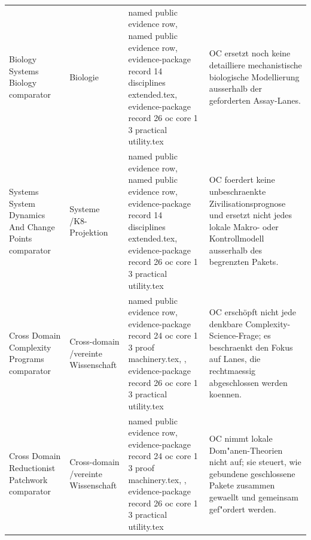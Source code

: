 \begin{longtable}{@{}L{0.20\textwidth}L{0.11\textwidth}L{0.33\textwidth}L{0.28\textwidth}@{}}
Biology Systems Biology comparator & Biologie & named public evidence row, named public evidence row, \allowbreak evidence-package record 14 disciplines extended.tex, \allowbreak evidence-package record 26 oc core 1 3 practical utility.tex & OC ersetzt noch keine detailliere mechanistische biologische Modellierung ausserhalb der geforderten Assay-Lanes. \\
Systems System Dynamics And Change Points comparator & Systeme /\allowbreak K8-Projektion & named public evidence row, named public evidence row, \allowbreak evidence-package record 14 disciplines extended.tex, \allowbreak evidence-package record 26 oc core 1 3 practical utility.tex & OC foerdert keine unbeschraenkte Zivilisationsprognose und ersetzt nicht jedes lokale Makro- oder Kontrollmodell ausserhalb des begrenzten Pakets. \\
Cross Domain Complexity Programs comparator & Cross-domain /\allowbreak vereinte Wissenschaft & named public evidence row, \allowbreak evidence-package record 24 oc core 1 3 proof machinery.tex, \allowbreak {}, \allowbreak evidence-package record 26 oc core 1 3 practical utility.tex & OC erschöpft nicht jede denkbare Complexity-Science-Frage; es beschraenkt den Fokus auf Lanes, die rechtmaessig abgeschlossen werden koennen. \\
Cross Domain Reductionist Patchwork comparator & Cross-domain /\allowbreak vereinte Wissenschaft & named public evidence row, \allowbreak evidence-package record 24 oc core 1 3 proof machinery.tex, \allowbreak {}, \allowbreak evidence-package record 26 oc core 1 3 practical utility.tex & OC nimmt lokale Dom"anen-Theorien nicht auf; sie steuert, wie gebundene geschlossene Pakete zusammen gewaellt und gemeinsam gef"ordert werden. \\
\bottomrule
\end{longtable}

